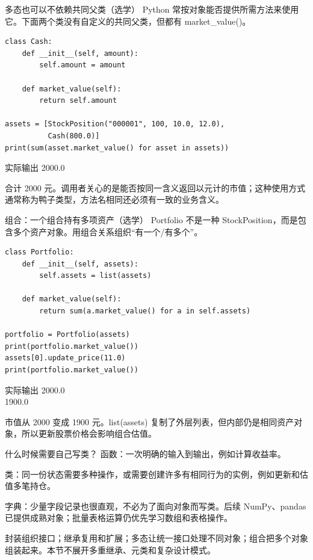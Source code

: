 \documentclass[9pt]{ctexbeamer}
\begin{document}
\begin{frame}[fragile]{多态也可以不依赖共同父类（选学）}
Python 常按对象能否提供所需方法来使用它。下面两个类没有自定义的共同父类，但都有 market\_value()。
\begin{lstlisting}
class Cash:
    def __init__(self, amount):
        self.amount = amount

    def market_value(self):
        return self.amount

assets = [StockPosition("000001", 100, 10.0, 12.0),
          Cash(800.0)]
print(sum(asset.market_value() for asset in assets))
\end{lstlisting}
\begin{exampleblock}{实际输出}
{\ttfamily\small 2000.0}
\end{exampleblock}
\small 合计 2000 元。调用者关心的是能否按同一含义返回以元计的市值；这种使用方式通常称为鸭子类型，方法名相同还必须有一致的业务含义。
\par{}

\end{frame}

\begin{frame}[fragile]{组合：一个组合持有多项资产（选学）}
Portfolio 不是一种 StockPosition，而是包含多个资产对象。用组合关系组织“有一个/有多个”。
\begin{lstlisting}
class Portfolio:
    def __init__(self, assets):
        self.assets = list(assets)

    def market_value(self):
        return sum(a.market_value() for a in self.assets)

portfolio = Portfolio(assets)
print(portfolio.market_value())
assets[0].update_price(11.0)
print(portfolio.market_value())
\end{lstlisting}
\begin{exampleblock}{实际输出}
{\ttfamily\small 2000.0\\
1900.0}
\end{exampleblock}
\small 市值从 2000 变成 1900 元。list(assets) 复制了外层列表，但内部仍是相同资产对象，所以更新股票价格会影响组合估值。
\par{}

\end{frame}

\begin{frame}{什么时候需要自己写类？}
函数：一次明确的输入到输出，例如计算收益率。
\par
类：同一份状态需要多种操作，或需要创建许多有相同行为的实例，例如更新和估值多笔持仓。
\par
字典：少量字段记录也很直观，不必为了面向对象而写类。后续 NumPy、pandas 已提供成熟对象；批量表格运算仍优先学习数组和表格操作。
\par
封装组织接口；继承复用和扩展；多态让统一接口处理不同对象；组合把多个对象组装起来。本节不展开多重继承、元类和复杂设计模式。
\par{}

\end{frame}
\end{document}
